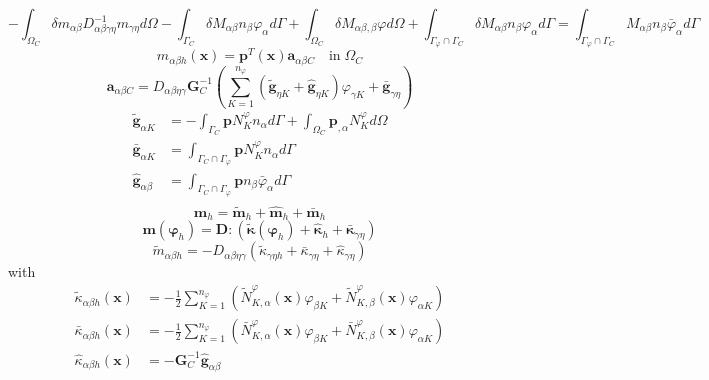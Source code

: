 \begin{equation}
-\int_{\Omega_C} \delta m_{\alpha \beta} D_{\alpha \beta \gamma \eta}^{-1} m_{\gamma \eta} d\Omega - \int_{\Gamma_C} \delta M_{\alpha \beta} n_{\beta} \varphi_{\alpha} d\Gamma + \int_{\Omega_C} \delta M_{\alpha \beta,\beta} \varphi d\Omega + \int_{\Gamma_\varphi\cap\Gamma_C} \delta M_{\alpha \beta} n_{\beta} \varphi_{\alpha} d\Gamma = \int_{\Gamma_{\varphi}\cap\Gamma_C} M_{\alpha \beta} n_{\beta} \bar{\varphi}_{\alpha} d\Gamma
\end{equation}
\begin{equation}
m_{\alpha\beta h}(\boldsymbol x) = \boldsymbol p^T(\boldsymbol x)\boldsymbol a_{\alpha\beta C}
\quad \mathrm{in}\;\Omega_C
\end{equation}
\begin{equation}
\boldsymbol a_{\alpha\beta C} = D_{\alpha\beta\eta\gamma}\boldsymbol G^{-1}_C
\left(\sum_{K=1}^{n_\varphi}(\tilde{\boldsymbol g}_{\eta K} + \hat{\boldsymbol g}_{\eta K})\varphi_{\gamma K} + \bar{\boldsymbol g}_{\gamma\eta}\right)
\end{equation}
\begin{align}
\tilde{\boldsymbol g}_{\alpha K} &= -\int_{\Gamma_C} \boldsymbol p N_{K}^\varphi n_\alpha d\Gamma
+ \int_{\Omega_C} \boldsymbol p_{,\alpha} N_K^\varphi d\Omega \\
\bar{\boldsymbol g}_{\alpha K} &= \int_{\Gamma_C\cap\Gamma_\varphi} \boldsymbol p N_{K}^\varphi n_\alpha d\Gamma \\
\hat{\boldsymbol g}_{\alpha\beta} &= \int_{\Gamma_C\cap\Gamma_\varphi} \boldsymbol p n_\beta \bar \varphi_\alpha d\Gamma \\
\end{align}
\begin{equation}
\boldsymbol m_{h} = \tilde{\boldsymbol m}_h + \hat{\boldsymbol m}_h + \bar{\boldsymbol m}_h 
\end{equation}
\begin{equation}
\boldsymbol m(\boldsymbol \varphi_h) = \boldsymbol D: (\tilde{\boldsymbol \kappa}(\boldsymbol \varphi_h) + \hat{\boldsymbol \kappa}_{h} + \bar{\boldsymbol \kappa}_{\gamma \eta})
\end{equation}
\begin{equation}
\tilde m_{\alpha\beta h} = -D_{\alpha\beta\eta\gamma}(\tilde \kappa_{\gamma\eta h} + \bar \kappa_{\gamma\eta} + \hat \kappa_{\gamma \eta})
\end{equation}
with
\begin{align}
\tilde \kappa_{\alpha\beta h}(\boldsymbol x) &= -\frac{1}{2}\sum_{K=1}^{n_\varphi} \left(\tilde N_{K,\alpha}^\varphi(\boldsymbol x) \varphi_{\beta K} + \tilde N_{K,\beta}^\varphi(\boldsymbol x) \varphi_{\alpha K}\right) \\
\bar \kappa_{\alpha\beta h}(\boldsymbol x) &= -\frac{1}{2}\sum_{K=1}^{n_\varphi} \left(\bar N_{K,\alpha}^\varphi(\boldsymbol x) \varphi_{\beta K} + \bar N_{K,\beta}^\varphi(\boldsymbol x) \varphi_{\alpha K}\right) \\
\hat \kappa_{\alpha\beta h}(\boldsymbol x) &=- \boldsymbol G_C^{-1} \hat{\boldsymbol g}_{\alpha\beta}
\end{align}
